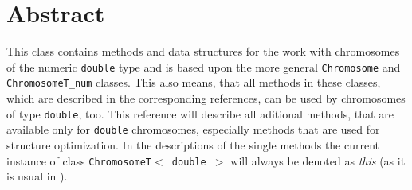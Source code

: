 \section{Abstract}

This class contains methods and data structures for the work
with chromosomes of the numeric {\tt double} type and
is based upon the more general {\tt Chromosome} and 
{\tt ChromosomeT\_num} classes.
This also means, that all methods in these classes, which are
described in the corresponding references, can be used by
chromosomes of type {\tt double}, too.
This reference will describe all aditional methods, that
are available only for {\tt double} chromosomes, especially
methods that are used for structure optimization.
In the descriptions of the single methods the current instance
of class {\tt ChromosomeT$<$\nolinebreak\ double $>$}
will always be denoted as {\em this} (as it is usual in \cpp).

